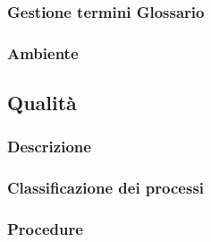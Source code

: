 \subsubsection{Gestione termini Glossario}

\subsubsection{Ambiente}

\subsection{Qualità}

\subsubsection{Descrizione}

\subsubsection{Classificazione dei processi}

\subsubsection{Procedure}


